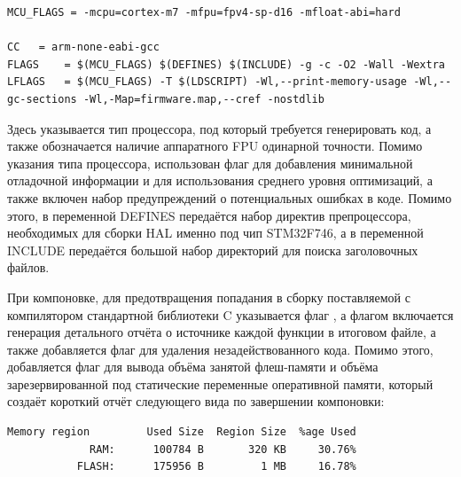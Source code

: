 \documentclass[rusmathsym, eqnumwithinsec, amspack, hyperref]{bomgost}
\begin{document}
\lstset{
	language=c,
	basicstyle=\scriptsize\ttfamily,
	numbers=left,
	stepnumber=1,
	showstringspaces=false,
	tabsize=4,
	breaklines=true,
	breakatwhitespace=false,
	xleftmargin=.1\textwidth, xrightmargin=.1\textwidth,
	belowskip=1em, aboveskip=1em
}
\begin{lstlisting}
MCU_FLAGS = -mcpu=cortex-m7 -mfpu=fpv4-sp-d16 -mfloat-abi=hard

CC	 = arm-none-eabi-gcc
FLAGS	 = $(MCU_FLAGS) $(DEFINES) $(INCLUDE) -g -c -O2 -Wall -Wextra
LFLAGS	 = $(MCU_FLAGS) -T $(LDSCRIPT) -Wl,--print-memory-usage -Wl,--gc-sections -Wl,-Map=firmware.map,--cref -nostdlib
\end{lstlisting}

Здесь указывается тип процессора, под который требуется генерировать код, а также обозначается наличие аппаратного FPU одинарной точности. Помимо указания типа процессора, использован флаг {\footnotesize{}} для добавления минимальной отладочной информации и {\footnotesize{}} для использования среднего уровня оптимизаций, а также включен набор предупреждений {\footnotesize{}} о потенциальных ошибках в коде. Помимо этого, в переменной DEFINES передаётся набор директив препроцессора, необходимых для сборки HAL именно под чип STM32F746, а в переменной INCLUDE передаётся большой набор директорий для поиска заголовочных файлов.

При компоновке, для предотвращения попадания в сборку поставляемой с компилятором стандартной библиотеки C указывается флаг {\footnotesize{}}, а флагом {\footnotesize{}} включается генерация детального отчёта о источнике каждой функции в итоговом файле, а также добавляется флаг {\footnotesize{}} для удаления незадействованного кода. Помимо этого, добавляется флаг {\footnotesize{}} для вывода объёма занятой флеш-памяти и объёма зарезервированной под статические переменные оперативной памяти, который создаёт короткий отчёт следующего вида по завершении компоновки:

\lstset{
	language=c,
	basicstyle=\scriptsize\ttfamily,
	numbers=left,
	stepnumber=1,
	showstringspaces=false,
	tabsize=4,
	breaklines=true,
	breakatwhitespace=false,
	xleftmargin=.1\textwidth, xrightmargin=.1\textwidth,
	belowskip=1em, aboveskip=1em
}
\begin{lstlisting}
Memory region         Used Size  Region Size  %age Used
             RAM:      100784 B       320 KB     30.76%
           FLASH:      175956 B         1 MB     16.78%
\end{lstlisting}
\end{document}
